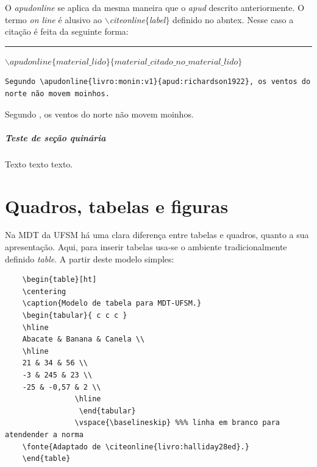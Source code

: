 \documentclass[oneside,openright,12pt]{ufsm_2015} %
\begin{document}
      \par O \textit{apudonline} se aplica da mesma maneira que o \textit{apud} descrito anteriormente. O termo \textit{on line} é alusivo ao \textit{$\backslash$citeonline$\{$label$\}$} definido no abntex. Nesse caso a citação é feita da seguinte forma:
      \begin{center}
      \rule{0.5\textwidth}{1pt}
            $\backslash apudonline\{material\_lido\}\{material\_citado\_no\_material\_lido\}$ \\
      \end{center}

 \begin{verbatim}
Segundo \apudonline{livro:monin:v1}{apud:richardson1922}, os ventos do
norte não movem moinhos.
\end{verbatim}

            Segundo , os ventos do norte não movem moinhos.

       \paragraph{Teste de seção quinária}
       
       
       \par Texto texto texto.
       
       
         \chapter{Quadros, tabelas e figuras}
         
         \par Na MDT da UFSM há uma clara diferença entre tabelas e quadros, quanto a sua apresentação. Aqui, para inserir tabelas usa-se o ambiente tradicionalmente definido \textit{table}. A partir deste modelo simples:
         

        
        
         \begin{verbatim}
    \begin{table}[ht]
    \centering
    \caption{Modelo de tabela para MDT-UFSM.}
    \begin{tabular}{ c c c }
    \hline
    Abacate & Banana & Canela \\
    \hline
    21 & 34 & 56 \\
    -3 & 245 & 23 \\
    -25 & -0,57 & 2 \\
                \hline
                 \end{tabular}
                \vspace{\baselineskip} %%% linha em branco para atendender a norma
    \fonte{Adaptado de \citeonline{livro:halliday28ed}.}
    \end{table}
    \end{verbatim}
         
\end{document}
